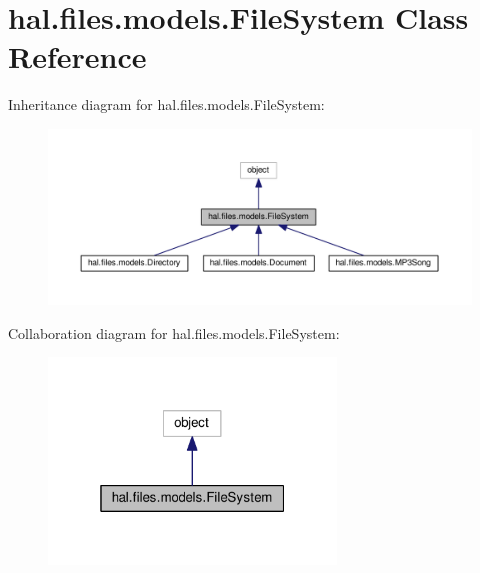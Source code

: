 \hypertarget{classhal_1_1files_1_1models_1_1_file_system}{}\section{hal.\+files.\+models.\+File\+System Class Reference}
\label{classhal_1_1files_1_1models_1_1_file_system}


Inheritance diagram for hal.\+files.\+models.\+File\+System\+:
\nopagebreak
\begin{figure}[H]
\begin{center}
\leavevmode
\includegraphics[width=350pt]{classhal_1_1files_1_1models_1_1_file_system__inherit__graph}
\end{center}
\end{figure}


Collaboration diagram for hal.\+files.\+models.\+File\+System\+:
\nopagebreak
\begin{figure}[H]
\begin{center}
\leavevmode
\includegraphics[width=217pt]{classhal_1_1files_1_1models_1_1_file_system__coll__graph}
\end{center}
\end{figure}
